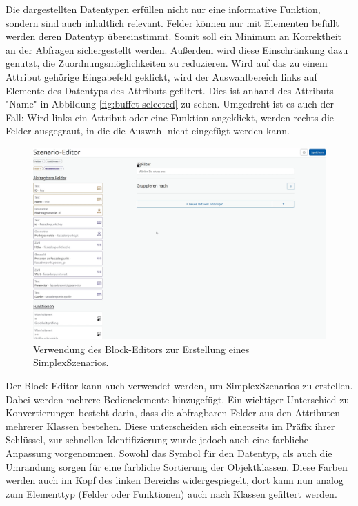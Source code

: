 Die dargestellten Datentypen erfüllen nicht nur eine informative Funktion, sondern sind auch inhaltlich relevant. Felder können nur mit Elementen befüllt werden deren Datentyp übereinstimmt. Somit soll ein Minimum an Korrektheit an der Abfragen sichergestellt werden. Außerdem wird diese Einschränkung dazu genutzt, die Zuordnungsmöglichkeiten zu reduzieren. Wird auf das zu einem Attribut gehörige Eingabefeld geklickt, wird der Auswahlbereich links auf Elemente des Datentyps des Attributs gefiltert. Dies ist anhand des Attributs "Name" in Abbildung \ref{fig:buffet-selected} zu sehen. Umgedreht ist es auch der Fall: Wird links ein Attribut oder eine Funktion angeklickt, werden rechts die Felder ausgegraut, in die die Auswahl nicht eingefügt werden kann. 

\begin{figure}[ht]
  \begin{center}
    \includegraphics[width=.95\textwidth]{assets/buffet-scenario.png}
  \end{center}
  \caption{Verwendung des Block-Editors zur Erstellung eines SimplexSzenarios. }
  \label{fig:buffet-scenario}
\end{figure}

Der Block-Editor kann auch verwendet werden, um SimplexSzenarios zu erstellen. Dabei werden mehrere Bedienelemente hinzugefügt. Ein wichtiger Unterschied zu Konvertierungen besteht darin, dass die abfragbaren Felder aus den Attributen mehrerer Klassen bestehen. Diese unterscheiden sich einerseits im Präfix ihrer Schlüssel, zur schnellen Identifizierung wurde jedoch auch eine farbliche Anpassung vorgenommen. Sowohl das Symbol für den Datentyp, als auch die Umrandung sorgen für eine farbliche Sortierung der Objektklassen. Diese Farben werden auch im Kopf des linken Bereichs widergespiegelt, dort kann nun analog zum Elementtyp (Felder oder Funktionen) auch nach Klassen gefiltert werden. 

